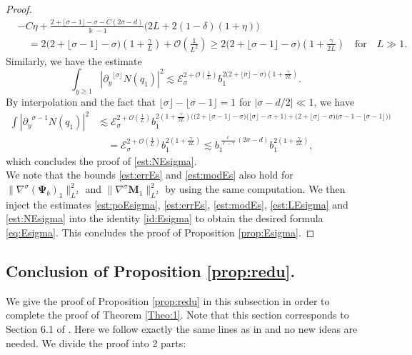 \documentclass[11pt]{aims}
\theoremstyle{definition}
\numberwithin{equation}{section}
\begin{document}
\begin{proof}
\begin{align*}
&-C \eta + {\frac{2 + \lfloor\sigma -1 \rfloor - \sigma - C(2\sigma - d)}{\Bbbk - 1}}\big(2L + 2(1 - \delta)(1 + \eta)\big)\\
& \quad = 2\big(2 + \lfloor\sigma -1 \rfloor - \sigma \big)\left(1 +\frac{\gamma}{L} \right) + {\mathcal{O}}\left(\frac{1}{L^2}\right) \geq 2\big(2 + \lfloor\sigma -1 \rfloor - \sigma \big)\left(1 +\frac{\gamma}{2L} \right) \quad \text{for}\quad L \gg 1.
\end{align*}
Similarly, we have the estimate
$$\int_{y \geq 1}|{\partial_y}^{\lfloor\sigma\rfloor} N(q_1)|^2  \lesssim {\mathscr{E}}_\sigma^{2 + {\mathcal{O}}\left(\frac{1}{L}\right)}b_1^{2 \big(2 + \lfloor\sigma\rfloor - \sigma\big)\left(1 + \frac{\gamma}{2L}\right)}.$$
By interpolation and the fact that $\lfloor\sigma\rfloor - \lfloor\sigma -1 \rfloor = 1$ for $|\sigma - d/2| \ll 1$, we have 
\begin{align*}
\int|{\partial_y}^{\sigma - 1} N(q_1)|^2  &\lesssim {\mathscr{E}}_\sigma^{2 + {\mathcal{O}}\left(\frac{1}{L}\right)} b_1^{2\left( 1 + \frac{\gamma}{2L}\right)\Big( \big(2 + \lfloor\sigma -1 \rfloor - \sigma\big)\big(\lfloor\sigma \rfloor - \sigma + 1\big) + \big(2 + \lfloor\sigma\rfloor - \sigma\big)\big(\sigma - 1 - \lfloor\sigma -1 \rfloor\big) \Big)}\\
& \quad = {\mathscr{E}}_\sigma^{2 + {\mathcal{O}}\left(\frac{1}{L}\right)} b_1^{2\left( 1 + \frac{\gamma}{2L}\right)} \lesssim b_1^{\frac{\ell}{\ell - \gamma}(2\sigma - d)}b_1^{2\left( 1 + \frac{\gamma}{2L}\right)},
\end{align*}
which concludes the proof of \eqref{est:NEsigma}. \\

We note that the bounds \eqref{est:errEs} and \eqref{est:modEs} also hold for $\| \nabla^\sigma (\mathbf{\Psi}_b)_1\|^2_{L^2}$ and $\|\nabla^\sigma \mathbf{M}_1\|^2_{L^2}$ by using the same computation. We then inject the estimates \eqref{est:poEsigma}, \eqref{est:errEs}, \eqref{est:modEs}, \eqref{est:LEsigma} and \eqref{est:NEsigma} into the identity \eqref{id:Esigma} to obtain the desired formula \eqref{eq:Esigma}. This concludes the proof of Proposition \ref{prop:Esigma}.
\end{proof}

\subsection{Conclusion of Proposition \ref{prop:redu}.}
We give the proof of Proposition \ref{prop:redu} in this subsection in order to complete the proof of Theorem \ref{Theo:1}. Note that this section corresponds to Section 6.1 of \cite{MRRcjm15}. Here we follow exactly the same lines as in \cite{MRRcjm15} and no new ideas are needed. We divide the proof into 2 parts:
\end{document}
